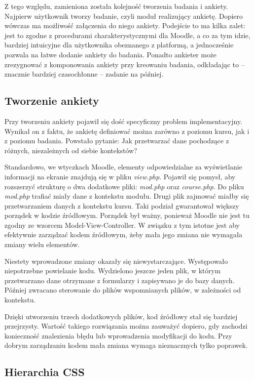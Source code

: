 Z tego względu, zamieniona została kolejność tworzenia badania i ankiety. Najpierw użytkownik tworzy badanie, czyli moduł realizujący ankietę. Dopiero wówczas ma możliwość załączenia do niego ankiety. Podejście to ma kilka zalet: jest to zgodne z procedurami charakterystycznymi dla Moodle, a co za tym idzie, bardziej intuicyjne dla użytkownika obeznanego z platformą, a jednocześnie pozwala na łatwe dodanie ankiety do badania. Ponadto ankieter może zrezygnować z komponowania ankiety przy kreowaniu badania, odkładając to -- znacznie bardziej czasochłonne -- zadanie na później.

\subsection{Tworzenie ankiety}
\label{Chapter629}

Przy tworzeniu ankiety pojawił się dość specyficzny problem implementacyjny. Wynikał on z faktu, że ankietę definiować można zarówno z poziomu kursu, jak i z poziomu badania. Powstało pytanie: Jak przetwarzać dane pochodzące z różnych, niezależnych od siebie kontekstów?

Standardowo, we wtyczkach Moodle, elementy odpowiedzialne za wyświetlanie informacji na ekranie znajdują się w pliku \textit{view.php}. Pojawił się pomysł, aby rozszerzyć strukturę o dwa dodatkowe pliki: \textit{mod.php} oraz \textit{course.php}. Do pliku \textit{mod.php} trafiać miały dane z kontekstu modułu. Drugi plik zajmować miałby się przetwarzaniem danych z kontekstu kursu. Taki podział gwarantował większy porządek w kodzie źródłowym. Porządek był ważny, ponieważ Moodle nie jest tu zgodny ze wzorcem Model-View-Controller. W związku z tym istotne jest aby efektywnie zarządzać kodem źródłowym, żeby mała jego zmiana nie wymagała zmiany wielu elementów.

Niestety wprowadzone zmiany okazały się niewystarczające. Występowało niepotrzebne powielanie kodu. Wydzielono jeszcze jeden plik, w którym przetwarzano dane otrzymane z formularzy i zapisywano je do bazy danych. Później zwracano sterowanie do plików wspomnianych plików, w zależności od kontekstu.

Dzięki utworzeniu trzech dodatkowych plików, kod źródłowy stał się bardziej przejrzysty. Wartość takiego rozwiązania można zauważyć dopiero, gdy zachodzi konieczność znalezienia błędu lub wprowadzenia modyfikacji do kodu. Przy dobrym zarządzaniu kodem mała zmiana wymaga nieznacznych tylko poprawek.

\subsection{Hierarchia CSS}
\label{Chapter62a}

